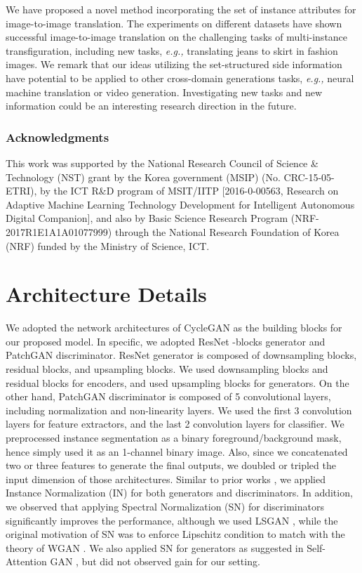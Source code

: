 \documentclass{article} \usepackage{iclr2019_conference,times}
\begin{document}
We have proposed a novel method incorporating the set of instance attributes for image-to-image translation.
The experiments on different datasets have shown successful image-to-image translation on the challenging tasks of multi-instance transfiguration,
including new tasks, \textit{e.g.,} translating jeans to skirt in fashion images.
We remark that our ideas utilizing the set-structured side information  
have potential to be applied to other cross-domain generations tasks,
\textit{e.g.,} neural machine translation or video generation.
Investigating new tasks and new information could be an interesting research direction in the future. 
\subsubsection*{Acknowledgments}
This work was supported by the National Research Council of Science \& Technology (NST) grant by the Korea government (MSIP) (No. CRC-15-05-ETRI),
by the ICT R\&D program of MSIT/IITP [2016-0-00563, Research on Adaptive Machine Learning Technology Development for Intelligent Autonomous Digital Companion],
and also by Basic Science Research Program (NRF-2017R1E1A1A01077999) through the National Research Foundation of Korea (NRF) funded by the Ministry of Science, ICT.




\newpage
\appendix
\section{Architecture Details}
\label{sec:architecture-details}
We adopted the network architectures of CycleGAN \citep{zhu2017unpaired} as the building blocks for our proposed model.
In specific, we adopted ResNet -blocks generator \citep{johnson2016perceptual, he2016deep} and PatchGAN \citep{isola2017image} discriminator.
ResNet generator is composed of downsampling blocks, residual blocks, and upsampling blocks.
We used downsampling blocks and residual blocks for encoders, and used upsampling blocks for generators.
On the other hand, PatchGAN discriminator is composed of 5 convolutional layers, including normalization and non-linearity layers.
We used the first 3 convolution layers for feature extractors, and the last 2 convolution layers for classifier.
We preprocessed instance segmentation as a binary foreground/background mask, hence simply used it as an 1-channel binary image.
Also, since we concatenated two or three features to generate the final outputs, we doubled or tripled the input dimension of those architectures.
Similar to prior works \citep{johnson2016perceptual, zhu2017unpaired},
we applied Instance Normalization (IN) \citep{ulyanov2016instance} for both generators and discriminators.
In addition, we observed that applying Spectral Normalization (SN) \citep{miyato2018spectral}
for discriminators significantly improves the performance, although we used LSGAN \citep{mao2017least},
while the original motivation of SN was to enforce Lipschitz condition to match with the theory of WGAN \citep{arjovsky2017wasserstein, gulrajani2017improved}.
We also applied SN for generators as suggested in Self-Attention GAN \citep{zhang2018self}, but did not observed gain for our setting.
\end{document}

